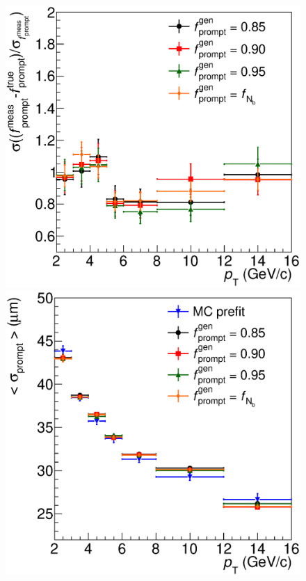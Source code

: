 \documentclass[b5paper,10pt,twoside,oldstyle,classica]{toptesi}
\begin{document}
\begin{figure}[tb]
\begin{center}
{\includegraphics[scale = 0.32]{Pulls_bkg_freesigma.eps}}
\hspace{-0.6cm}
{\includegraphics[scale = 0.32]{Sigma_bkg_freesigma.eps}}

\end{center}
\end{figure}
\end{document}
